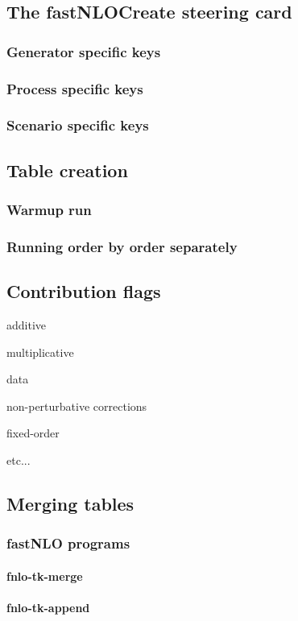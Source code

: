 \documentclass[a4paper,11pt]{article}
\begin{document}
\subsection{The fastNLOCreate steering card}
\subsubsection{Generator specific keys}
\subsubsection{Process specific keys}
\subsubsection{Scenario specific keys}

\subsection{Table creation}
\subsubsection{Warmup run}
\subsubsection{Running order by order separately}

\subsection{Contribution flags}
additive

multiplicative

data

non-perturbative corrections

fixed-order

etc...

\subsection{Merging tables}
\subsubsection{fastNLO programs}
\paragraph{fnlo-tk-merge}
\paragraph{fnlo-tk-append}
\end{document}
